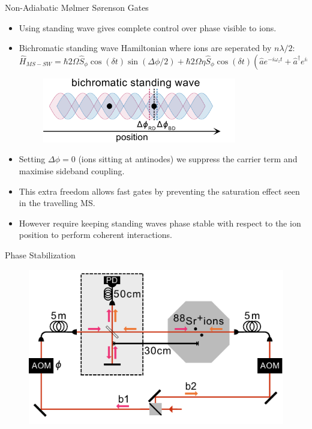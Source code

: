\documentclass[final]{beamer}
\begin{document}
\begin{frame}{}
\begin{center}
\begin{columns}[t]
\begin{column}{0.49\textwidth}
\begin{alertblock}{Non-Adiabatic Mølmer Sørenson Gates}
      \begin{itemize}
      \item Using standing wave gives complete control over phase
        visible to ions.
      \item Bichromatic standing wave Hamiltonian where ions are
        seperated by $n\lambda/2$:
      \large$$ \hat{H}_{MS-SW} = \hbar 2\Omega \hat{S}_{\phi}\cos{(\delta t)}\sin{(\Delta\phi/2)} + \hbar 2\Omega\eta \hat{S}_\phi\cos{(\delta t)}(\hat{a}e^{-i\omega_zt} + \hat{a}^\dagger e^{i\omega_zt})\cos{(\Delta\phi/2)}$$\normalsize
      \begin{figure}
        \includegraphics[width=0.8\textwidth]{./figs/bichro.pdf}
      \end{figure}
      \item Setting $\Delta\phi = 0$ (ions sitting at antinodes) we
        suppress the carrier term and maximise sideband
        coupling.
      \item This extra freedom allows fast gates by preventing the
        saturation effect seen in the travelling MS.
      \item However require keeping standing waves phase stable with respect to the ion position to perform
            coherent interactions.
      \end{itemize}
    \end{alertblock}

    \begin{alertblock}{Phase Stabilization}
      \begin{minipage}{0.47\linewidth}
      \begin{figure}
        \includegraphics[width=1.05\textwidth]{./figs/setup+beams_horizontal_poster.pdf}
      \end{figure}


\end{minipage}
\end{alertblock}
\end{column}
\end{columns}
\end{center}
\end{frame}
\end{document}

